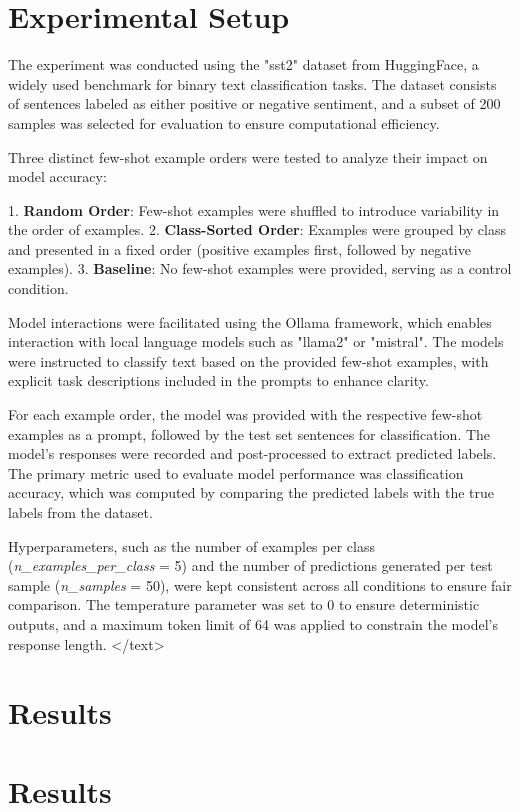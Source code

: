 \documentclass{article}
\begin{document}
\section*{Experimental Setup}

The experiment was conducted using the "sst2" dataset from HuggingFace, a widely used benchmark for binary text classification tasks. The dataset consists of sentences labeled as either positive or negative sentiment, and a subset of 200 samples was selected for evaluation to ensure computational efficiency.

Three distinct few-shot example orders were tested to analyze their impact on model accuracy:

1. \textbf{Random Order}: Few-shot examples were shuffled to introduce variability in the order of examples.
2. \textbf{Class-Sorted Order}: Examples were grouped by class and presented in a fixed order (positive examples first, followed by negative examples).
3. \textbf{Baseline}: No few-shot examples were provided, serving as a control condition.

Model interactions were facilitated using the Ollama framework, which enables interaction with local language models such as "llama2" or "mistral". The models were instructed to classify text based on the provided few-shot examples, with explicit task descriptions included in the prompts to enhance clarity.

For each example order, the model was provided with the respective few-shot examples as a prompt, followed by the test set sentences for classification. The model's responses were recorded and post-processed to extract predicted labels. The primary metric used to evaluate model performance was classification accuracy, which was computed by comparing the predicted labels with the true labels from the dataset.

Hyperparameters, such as the number of examples per class (\textit{n\_examples\_per\_class} = 5) and the number of predictions generated per test sample (\textit{n\_samples} = 50), were kept consistent across all conditions to ensure fair comparison. The temperature parameter was set to 0 to ensure deterministic outputs, and a maximum token limit of 64 was applied to constrain the model's response length.
</text>
\section{Results}
\section{Results}
\end{document}
